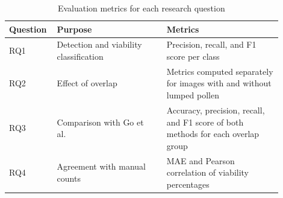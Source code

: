 \begin{table}[H]
    \centering
    \caption{Evaluation metrics for each research question}
    \label{tab:evaluation}
    \begin{tabular}{p{0.12\linewidth} p{0.38\linewidth} p{0.40\linewidth}}
        \toprule
        \textbf{Question} & \textbf{Purpose} & \textbf{Metrics} \\
        \midrule
        RQ1 & Detection and viability classification & Precision, recall, and F1 score per class \\
        RQ2 & Effect of overlap & Metrics computed separately for images with and without lumped pollen \\
        RQ3 & Comparison with Go et al.~\cite{go2019} & Accuracy, precision, recall, and F1 score of both methods for each overlap group \\
        RQ4 & Agreement with manual counts & MAE and Pearson correlation of viability percentages \\
        \bottomrule
    \end{tabular}
\end{table}
